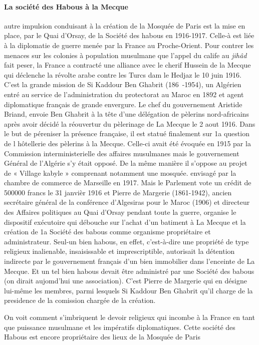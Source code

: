 \paragraph{La société des Habous à la Mecque}
autre impulsion conduisant à la création de la Mosquée de
Paris est la mise en place, par le Quai d'Orsay, de la Société des
habous en 1916-1917. Celle-à est liée à la diplomatie de guerre
menée par la France au Proche-Orient. Pour contrer les menaces
sur les colonies à population musulmane que l'appel du calife au
\emph{jihâd} fait peser, la France a contracté une alliance avec le cherif
Hussein de la Mecque qui déclenche la révolte arabe contre les
Turcs dam le Hedjaz le 10 juin 1916. C'est la grande mission de
Si Kaddour Ben Ghabrit (186~-1954), un Algérien entré au service
de l'administration du protectorat au Maroc en 1892 et
agent diplomatique français de grande envergure.
Le chef du gouvernement Aristide Briand, envoie Ben Ghabrit à
la tête d'une délégation de pèlerins nord-africains après avoir
décidé la réouvertur du pèlerinage de La Mecque le 2 aout 1916.
Dans le but de péreniser la présence française, il est statué finalement
sur 1a question de l hôtellerie des pèlerins à la Mecque.
Celle-ci avait été évoquée en 1915 par la Commission interministerielle
des affaires musulmanes mais le gouvernement Général
de l'Algérie s'y était opposé. De la même manière il s'oppose
au projet de « Village kabyle » comprenant notamment une mosquée.
envisagé par la chambre de commerce de Marseille en
1917. Mais le Parlement vote un crédit de 500000 francs le
31 janvièr 1916 et Pierre de Margerie (1861-1942), ancien secrétaire
général de la conférence d'Algesiras pour le Maroc (1906)
et directeur des Affaires politiques au Quai d'Orsay pendant toute
la guerre, organise le dispositif exécutoire qui débouche sur
l'achat d'un batiment à La Mecque et la création de 1a Société des
babous comme organisme propriétaire et administrateur.
Seul-un bien habous, en effet, c'est-à-dire une propriété de type
religieux inalienable, insaisissable et imprescriptible, autorisait
la détention indirecte par le gouvernement français d'un bien
immobilier dans l'enceinte de La Mecque. Et un tel bien habous
devait être administré par une Société des babous (on dirait
aujomd'hui une association). C'est Pierre de Margerie qui en
désigne lui-même les membres, parmi lesquels Si Kaddour Ben
Ghabrit qu'il charge de la presidence de la comission chargée de la création. 

\begin{Synthesis}
On voit comment
s'imbriquent le devoir religieux qui incombe à la France en tant
que puissance musulmane et les impératifs diplomatiques.
Cette société des Habous est encore propriétaire des lieux de la Mosquée de Paris
\end{Synthesis}

